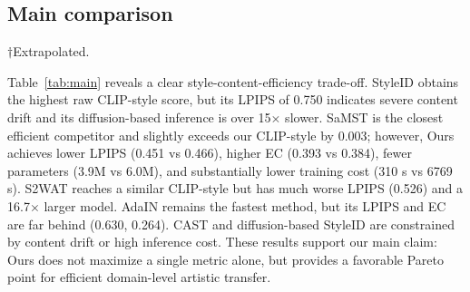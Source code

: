 ﻿\documentclass[letterpaper]{article}
\begin{document}
\subsection{Main comparison}
\begin{table}[t]
\centering
\caption{Strict-750 comparison with efficiency. $\uparrow$ = higher is better, $\downarrow$ = lower is better. Inference time end-to-end for 750 images. Training times marked $\dagger$ are extrapolated.}
\label{tab:main}
\small
\setlength{\tabcolsep}{5pt}
\smallskip
\footnoterule\small
$\dagger$Extrapolated.
\end{table}

Table~\ref{tab:main} reveals a clear style-content-efficiency trade-off. StyleID obtains the highest raw CLIP-style score, but its LPIPS of 0.750 indicates severe content drift and its diffusion-based inference is over 15$\times$ slower. SaMST is the closest efficient competitor and slightly exceeds our CLIP-style by 0.003; however, Ours achieves lower LPIPS (0.451 vs 0.466), higher EC (0.393 vs 0.384), fewer parameters (3.9M vs 6.0M), and substantially lower training cost (310 s vs 6769 s). S2WAT reaches a similar CLIP-style but has much worse LPIPS (0.526) and a 16.7$\times$ larger model. AdaIN remains the fastest method, but its LPIPS and EC are far behind (0.630, 0.264). CAST and diffusion-based StyleID are constrained by content drift or high inference cost. These results support our main claim: Ours does not maximize a single metric alone, but provides a favorable Pareto point for efficient domain-level artistic transfer.
\end{document}
